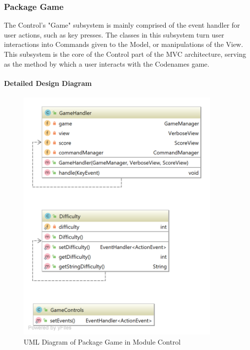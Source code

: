 \subsubsection{Package Game}
The Control's "Game" subsystem is mainly comprised of the event handler for user actions, such as key presses. The classes in this subsystem turn user interactions into Commands given to the Model, or manipulations of the View. This subsystem is the core of the Control part of the MVC architecture, serving as the method by which a user  interacts with the Codenames game.

\paragraph{Detailed Design Diagram}\mbox{}
\begin{figure}[H]
\centering
\includegraphics[width=10cm]{Source/Module/Control/Game/Control_Game.png}\caption{UML Diagram of Package Game in Module Control}
\label{Control.Game}
\end{figure}



